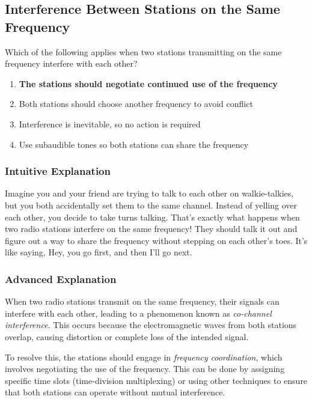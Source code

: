 \subsection{Interference Between Stations on the Same Frequency}\label{T2B08}

\begin{tcolorbox}[colback=gray!10!white,colframe=black!75!black,title=T2B08]
Which of the following applies when two stations transmitting on the same frequency interfere with each other?
\begin{enumerate}[label=\Alph*)]
    \item \textbf{The stations should negotiate continued use of the frequency}
    \item Both stations should choose another frequency to avoid conflict
    \item Interference is inevitable, so no action is required
    \item Use subaudible tones so both stations can share the frequency
\end{enumerate}
\end{tcolorbox}

\subsubsection{Intuitive Explanation}
Imagine you and your friend are trying to talk to each other on walkie-talkies, but you both accidentally set them to the same channel. Instead of yelling over each other, you decide to take turns talking. That's exactly what happens when two radio stations interfere on the same frequency! They should talk it out and figure out a way to share the frequency without stepping on each other's toes. It's like saying, Hey, you go first, and then I'll go next.

\subsubsection{Advanced Explanation}
When two radio stations transmit on the same frequency, their signals can interfere with each other, leading to a phenomenon known as \textit{co-channel interference}. This occurs because the electromagnetic waves from both stations overlap, causing distortion or complete loss of the intended signal. 

To resolve this, the stations should engage in \textit{frequency coordination}, which involves negotiating the use of the frequency. This can be done by assigning specific time slots (time-division multiplexing) or using other techniques to ensure that both stations can operate without mutual interference. 

